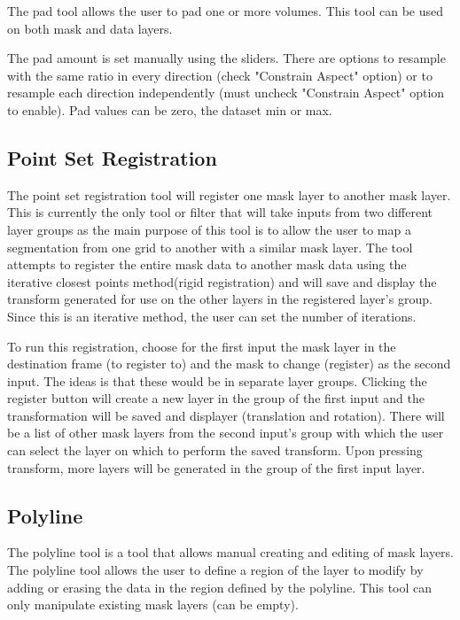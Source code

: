 \documentclass[fleqn,11pt,openany]{book}
\begin{document}
The pad tool allows the user to pad one or more volumes. This tool can be used on both mask and data layers.

The pad amount is set manually using the sliders. There are options to resample with the same ratio in every direction (check "Constrain Aspect" option) or to resample each direction independently (must uncheck "Constrain Aspect" option to enable). Pad values can be zero, the dataset min or max.

\subsection{Point Set Registration}

The point set registration tool will register one mask layer to another mask layer.  This is currently the only tool or filter that will take inputs from two different layer groups as the main purpose of this tool is to allow the user to map a segmentation from one grid to another with a similar mask layer.  The tool attempts to register the entire mask data to another mask data using the iterative closest points method(rigid registration) and will save and display the transform generated for use on the other layers in the registered layer's group.  Since this is an iterative method, the user can set the number of iterations. 

To run this registration, choose for the first input the mask layer in the destination frame (to register to) and the mask to change (register) as the second input.  The ideas is that these would be in separate layer groups.  Clicking the register button will create a new layer in the group of the first input and the transformation will be saved and displayer (translation and rotation).  There will be a list of other mask layers from the second input's group with which the user can select the layer on which to perform the saved transform.  Upon pressing transform, more layers will be generated in the group of the first input layer.  

\subsection{Polyline}

The polyline tool is a tool that allows manual creating and editing of mask layers.  The polyline tool allows the user to define a region of the layer to modify by adding or erasing the data in the region defined by the polyline.  This tool can only manipulate existing mask layers (can be empty).  
\end{document}
